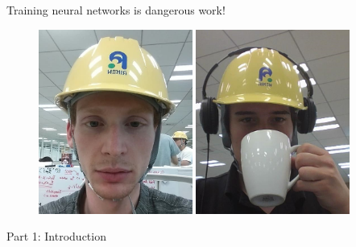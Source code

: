 \documentclass[mathserif,notheorems, hyperref={colorlinks, citecolor=blue, urlcolor=blue, linkcolor=blue}]{beamer}
\begin{document}
    \begin{frame}{Training neural networks is dangerous work!}
       
       \begin{figure}
            \centering
            \includegraphics[width=0.45\textwidth]{collaborators/helmet1} 
            \includegraphics[width=0.45\textwidth]{collaborators/helmet2} 
       \end{figure} 
    \end{frame}
  

    \begin{frame}
       \begin{center}
           \Huge Part 1: Introduction
       \end{center} 
    \end{frame}

\end{document}
